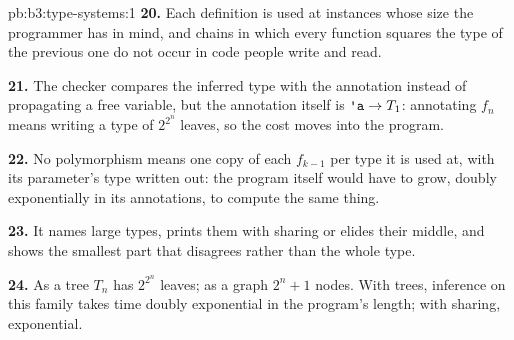 \begin{solution}{pb:b3:type-systems:1}
\textbf{20.} Each definition is used at instances whose size the programmer has in mind, and chains in which every function squares the type of the previous one do not occur in code people write and read.

\textbf{21.} The checker compares the inferred type with the annotation instead of propagating a free variable, but the annotation itself is $\text{\ttfamily\textquotesingle a} \to T_1$: annotating $f_n$ means writing a type of $2^{2^n}$ leaves, so the cost moves into the program.

\textbf{22.} No polymorphism means one copy of each $f_{k-1}$ per type it is used at, with its parameter's type written out: the program itself would have to grow, doubly exponentially in its annotations, to compute the same thing.

\textbf{23.} It names large types, prints them with sharing or elides their middle, and shows the smallest part that disagrees rather than the whole type.

\textbf{24.} As a tree $T_n$ has $2^{2^n}$ leaves; as a graph $2^n + 1$ nodes. With trees, inference on this family takes time doubly exponential in the program's length; with sharing, exponential.
\end{solution}
